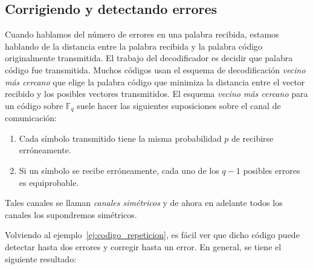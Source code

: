 \documentclass[a4paper,11pt]{article}
\numberwithin{equation}{section}
\theoremstyle{definition} %
\newcommand{\Fq}{\mathbb{F}_q}
\begin{document}
    \subsection{Corrigiendo y detectando errores}

    Cuando hablamos del número de errores en una palabra  recibida, estamos hablando de la distancia entre la palabra recibida y la palabra código originalmente transmitida. El trabajo del decodificador es decidir que palabra código fue transmitida. Muchos códigos usan el esquema de decodificación \emph{vecino más cercano} que elige la palabra código que minimiza la distancia entre el vector recibido y los posibles vectores transmitidos. El esquema \emph{vecino más cercano} para un código sobre $\Fq$ suele hacer las siguientes suposiciones sobre el canal de comunicación:

    \begin{enumerate}
        \item Cada símbolo transmitido tiene la misma probabilidad $p$ de recibirse erróneamente.
        \item Si un símbolo se recibe erróneamente, cada uno de los $q - 1$ posibles errores es equiprobable.
    \end{enumerate}

    Tales canales se llaman \emph{canales simétricos} y de ahora en adelante todos los canales los supondremos simétricos.

    Volviendo al ejemplo~\ref{ej:codigo_repeticion}, es fácil ver que dicho código puede detectar hasta dos errores y corregir hasta un error. En general, se tiene el siguiente resultado:
\end{document}
